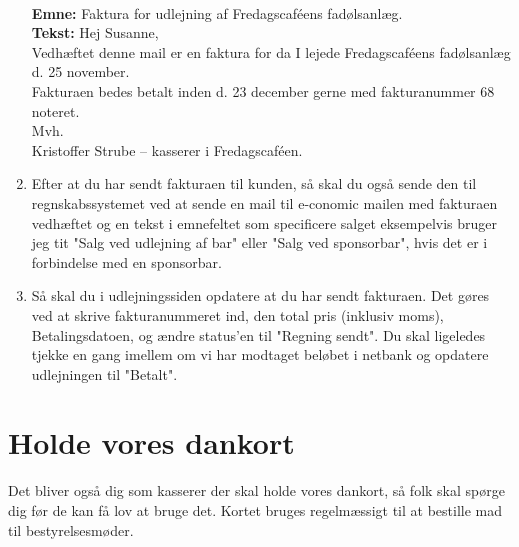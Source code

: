 \begin{enumerate}
    \\
    \textbf{Emne: } Faktura for udlejning af Fredagscaféens fadølsanlæg.\\
    \textbf{Tekst: } Hej Susanne,\\
    Vedhæftet denne mail er en faktura for da I lejede Fredagscaféens fadølsanlæg d. 25 november.\\
    Fakturaen bedes betalt inden d. 23 december gerne med fakturanummer 68 noteret.\\
    Mvh.\\
    Kristoffer Strube – kasserer i Fredagscaféen.
    \item Efter at du har sendt fakturaen til kunden, så skal du også sende den til regnskabssystemet ved at sende en mail til e-conomic mailen med fakturaen vedhæftet og en tekst i emnefeltet som specificere salget eksempelvis bruger jeg tit "Salg ved udlejning af bar" eller "Salg ved sponsorbar", hvis det er i forbindelse med en sponsorbar.
    \item Så skal du i udlejningssiden opdatere at du har sendt fakturaen. Det gøres ved at skrive fakturanummeret ind, den total pris (inklusiv moms), Betalingsdatoen, og ændre status'en til "Regning sendt". Du skal ligeledes tjekke en gang imellem om vi har modtaget beløbet i netbank og opdatere udlejningen til "Betalt".
\end{enumerate}

\section{Holde vores dankort}
Det bliver også dig som kasserer der skal holde vores dankort, så folk skal spørge dig før de kan få lov at bruge det. Kortet bruges regelmæssigt til at bestille mad til bestyrelsesmøder.

